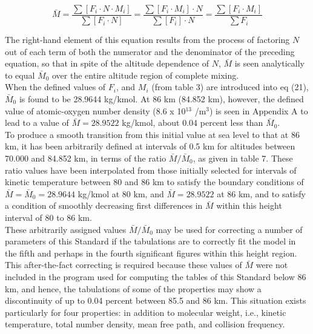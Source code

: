 \documentclass{article}
\begin{document}
\begin{equation}
 \bar{M} = \frac{\sum [F_i \cdot N \cdot M_i]}{\sum [F_i \cdot N]} = \frac{\sum [F_i \cdot M_i] \cdot N}{\sum [F_i] \cdot N} = \frac{\sum [F_i \cdot M_i]}{\sum F_i} \tag{21}
\end{equation}

The right-hand element of this equation results from the process of factoring $N$ out of each term of both the numerator and the denominator of the preceding equation, so that in spite of the altitude dependence of $N$, $\bar{M}$ is seen analytically to equal $\bar{M}_0$ over the entire altitude region of complete mixing.\\

When the defined values of $F_i$, and $M_i$ (from table 3) are introduced into eq (21), $\bar{M}_0$ is found to be 28.9644 kg/kmol. At 86 km (84.852 km), however, the defined value of atomic-oxygen number density (8.6 x 10$^{13}$ /m$^3$) is seen in Appendix A to lead to a value of $\bar{M} = 28.9522$ kg/kmol, about 0.04 percent less than $\bar{M}_0$.\\

To produce a smooth transition from this initial value at sea level to that at 86 km, it has been arbitrarily defined at intervals of 0.5 km for altitudes between 70.000 and 84.852 km, in terms of the ratio $\bar{M} / \bar{M}_0$, as given in table 7. These ratio values have been interpolated from those initially selected for intervals of kinetic temperature between 80 and 86 km to satisfy the boundary conditions of $\bar{M} = \bar{M}_0 = 28.9644$ kg/kmol at 80 km, and $\bar{M} = 28.9522$ at 86 km, and to satisfy a condition of smoothly decreasing first differences in $\bar{M}$ within this height interval of 80 to 86 km.\\

These arbitrarily assigned values $\bar{M} / \bar{M}_0$ may be used for correcting a number of parameters of this Standard if the tabulations are to correctly fit the model in the fifth and perhaps in the fourth significant figures within this height region.\\

This after-the-fact correcting is required because these values of $\bar{M}$ were not included in the program used for computing the tables of this Standard below 86 km, and hence, the tabulations of some of the properties may show a discontinuity of up to 0.04 percent between 85.5 and 86 km. This situation exists particularly for four properties: in addition to molecular weight, i.e., kinetic temperature, total number density, mean free path, and collision frequency.\\
\end{document}
